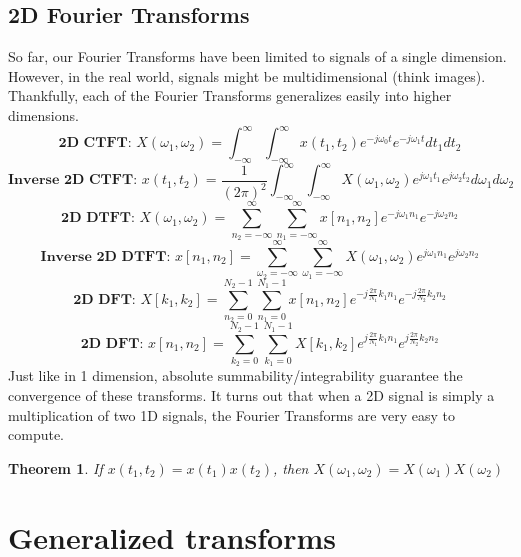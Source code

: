 \documentclass{article}
\newtheorem{theorem}{Theorem}
\begin{document}
\subsection{2D Fourier Transforms}
So far, our Fourier Transforms have been limited to signals of a single dimension. However, in the real world, signals might be multidimensional (think images).
Thankfully, each of the Fourier Transforms generalizes easily into higher dimensions.\\
$$\textbf{2D CTFT: }X(\omega_1, \omega_2) = \int_{-\infty}^{\infty}\int_{-\infty}^{\infty}{x(t_1, t_2)e^{-j\omega_0t}e^{-j\omega_1t}dt_1dt_2}$$
$$\textbf{Inverse 2D CTFT: }x(t_1, t_2) = \frac{1}{(2\pi)^2}\int_{-\infty}^{\infty}\int_{-\infty}^{\infty}{X(\omega_1, \omega_2)e^{j\omega_1t_1}e^{j\omega_2t_2}d\omega_1d\omega_2}$$
$$\textbf{2D DTFT: }X(\omega_1, \omega_2) = \sum_{n_2=-\infty}^{\infty}\sum_{n_1=-\infty}^{\infty}{x[n_1,n_2]e^{-j\omega_1n_1}e^{-j\omega_2n_2}}$$
$$\textbf{Inverse 2D DTFT: }x[n_1, n_2] = \sum_{\omega_2=-\infty}^{\infty}\sum_{\omega_1=-\infty}^{\infty}{X(\omega_1,\omega_2)e^{j\omega_1n_1}e^{j\omega_2n_2}}$$
$$\textbf{2D DFT: }X[k_1, k_2] = \sum_{n_2=0}^{N_2-1}\sum_{n_1=0}^{N_1-1}{x[n_1, n_2]e^{-j\frac{2\pi}{N_1}k_1 n_1}e^{-j\frac{2\pi}{N_2}k_2 n_2}}$$
$$\textbf{2D DFT: }x[n_1, n_2] = \sum_{k_2=0}^{N_2-1}\sum_{k_1=0}^{N_1-1}{X[k_1, k_2]e^{j\frac{2\pi}{N_1}k_1 n_1}e^{j\frac{2\pi}{N_2}k_2 n_2}}$$
Just like in 1 dimension, absolute summability/integrability guarantee the convergence of these transforms.
It turns out that when a 2D signal is simply a multiplication of two 1D signals, the Fourier Transforms are very easy to compute.
\begin{theorem}
    If $x(t_1, t_2) = x(t_1)x(t_2)$, then $X(\omega_1, \omega_2) = X(\omega_1)X(\omega_2)$
\end{theorem}
\section{Generalized transforms}
\end{document}
